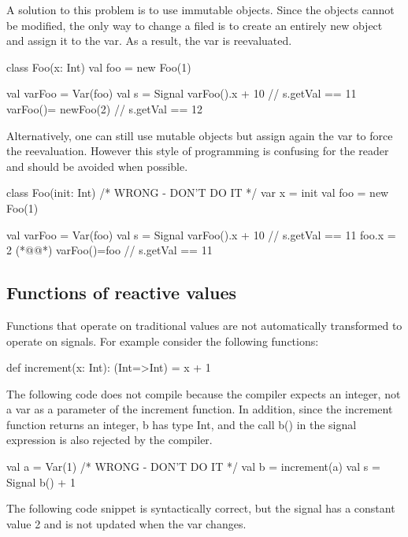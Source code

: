\documentclass[10pt,a4paper]{article}
\newcommand{\code}[1]{{\fontfamily{cmtt}\small\selectfont#1}}
\begin{document}
A solution to this problem is to use immutable objects. Since the
objects cannot be modified, the only way to change a filed is to
create an entirely new object and assign it to the var. As a result,
the var is reevaluated.

\begin{codenv}
class Foo(x: Int){}
val foo = new Foo(1)

val varFoo = Var(foo)           
val s = Signal{ varFoo().x + 10 }
// s.getVal == 11
varFoo()= newFoo(2)
// s.getVal == 12 
\end{codenv}

Alternatively, one can still use mutable objects but assign again the
var to force the reevaluation. However this style of programming is
confusing for the reader and should be avoided when possible.

\begin{codenv}
class Foo(init: Int){   /* WRONG - DON'T DO IT */
  var x = init
}
val foo = new Foo(1)

val varFoo = Var(foo)           
val s = Signal{ varFoo().x + 10 }
// s.getVal == 11
foo.x = 2 (*@\label{same}@*)
varFoo()=foo
// s.getVal == 11 
\end{codenv}


\subsection{Functions of reactive values} Functions that operate on
traditional values are not automatically transformed to operate on
signals. For example consider the following functions:

\begin{codenv}
def increment(x: Int): (Int=>Int) = x + 1
\end{codenv}

The following code does not compile because the compiler expects an
integer, not a var as a parameter of the \code{increment} function. In
addition, since the \code{increment} function returns an integer,
\code{b} has type \code{Int}, and the call \code{b()} in the signal
expression is also rejected by the compiler.

\begin{codenv}
val a = Var(1)           /* WRONG - DON'T DO IT */
val b = increment(a)
val s = Signal{ b() + 1 }
\end{codenv}

The following code snippet is syntactically correct, but the signal
has a constant value 2 and is not updated when the var changes.
\end{document}
